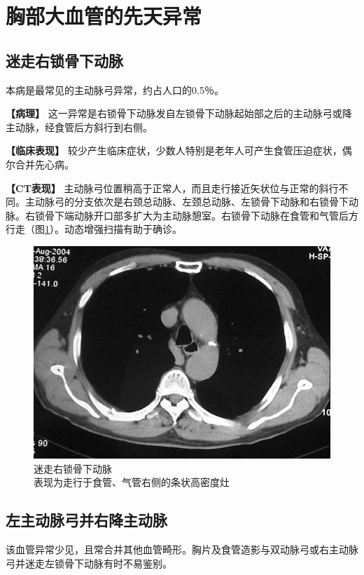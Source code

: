 \section{胸部大血管的先天异常}

\subsection{迷走右锁骨下动脉}

本病是最常见的主动脉弓异常，约占人口的0.5％。

\textbf{【病理】}
这一异常是右锁骨下动脉发自左锁骨下动脉起始部之后的主动脉弓或降主动脉，经食管后方斜行到右侧。

\textbf{【临床表现】}
较少产生临床症状，少数人特别是老年人可产生食管压迫症状，偶尔合并先心病。

\textbf{【CT表现】}
主动脉弓位置稍高于正常人，而且走行接近矢状位与正常的斜行不同。主动脉弓的分支依次是右颈总动脉、左颈总动脉、左锁骨下动脉和右锁骨下动脉。右锁骨下端动脉开口部多扩大为主动脉憩室。右锁骨下动脉在食管和气管后方行走（图\ref{fig10-2}）。动态增强扫描有助于确诊。

\begin{figure}[!htbp]
 \centering
 \includegraphics[width=.7\textwidth,height=\textheight,keepaspectratio]{./images/Image00261.jpg}
 \captionsetup{justification=centering}
 \caption{迷走右锁骨下动脉\\{\small 表现为走行于食管、气管右侧的条状高密度灶}}
 \label{fig10-2}
  \end{figure} 

\subsection{左主动脉弓并右降主动脉}

该血管异常少见，且常合并其他血管畸形。胸片及食管造影与双动脉弓或右主动脉弓并迷走左锁骨下动脉有时不易鉴别。

